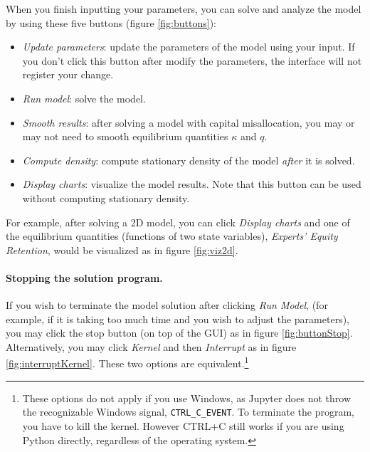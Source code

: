 \documentclass[12pt]{article}
\begin{document}
When you finish inputting your parameters, you can solve and analyze the model by using these five buttons (figure \ref{fig:buttons}):
\begin{itemize}
\item \textit{Update parameters}: update the parameters of the model using your input. If you don't click this button after modify the parameters, the interface will not register your change.
\item \textit{Run model}: solve the model.
\item \textit{Smooth results}: after solving a model with capital misallocation, you may or may not need to smooth equilibrium quantities $\kappa$ and $q$.
\item \textit{Compute density}: compute stationary density of the model \textit{after} it is solved.
\item \textit{Display charts}: visualize the model results. Note that this button can be used without computing stationary density.
\end{itemize}

For example, after solving a 2D model, you can click \textit{Display charts} and one of the equilibrium quantities (functions of two state variables), \textit{Experts' Equity Retention}, would be visualized as in figure \ref{fig:viz2d}.

\paragraph{Stopping the solution program.} If you wish to terminate the model solution after clicking \textit{Run Model}, (for example, if it is taking too much time and you wish to adjust the parameters), you may click the stop button (on top of the GUI) as in figure \ref{fig:buttonStop}. Alternatively, you may click \textit{Kernel} and then \textit{Interrupt} as in figure \ref{fig:interruptKernel}. These two options are equivalent.\footnote{These options do not apply if you use Windows, as Jupyter does not throw the recognizable Windows signal, \texttt{CTRL\_C\_EVENT}. To terminate the program, you have to kill the kernel. However CTRL+C still works if you are using Python directly, regardless of the operating system.}
\end{document}
